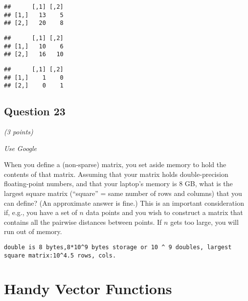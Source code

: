 \documentclass[
]{article}
\newenvironment{Shaded}{\begin{snugshade}}{\end{snugshade}}
\newcommand{\KeywordTok}[1]{\textcolor[rgb]{0.13,0.29,0.53}{\textbf{#1}}}
\newcommand{\NormalTok}[1]{#1}
\newcommand{\OperatorTok}[1]{\textcolor[rgb]{0.81,0.36,0.00}{\textbf{#1}}}
\newcommand{\StringTok}[1]{\textcolor[rgb]{0.31,0.60,0.02}{#1}}
\begin{document}
\begin{verbatim}
##      [,1] [,2]
## [1,]   13    5
## [2,]   20    8
\end{verbatim}

\begin{Shaded}
\end{Shaded}

\begin{verbatim}
##      [,1] [,2]
## [1,]   10    6
## [2,]   16   10
\end{verbatim}

\begin{Shaded}
\end{Shaded}

\begin{verbatim}
##      [,1] [,2]
## [1,]    1    0
## [2,]    0    1
\end{verbatim}

\hypertarget{question-23}{%
\subsection{Question 23}\label{question-23}}

\emph{(3 points)}

\emph{Use Google}

When you define a (non-sparse) matrix, you set aside memory to hold the
contents of that matrix. Assuming that your matrix holds
double-precision floating-point numbers, and that your laptop's memory
is 8 GB, what is the largest square matrix (``square'' = same number of
rows and columns) that you can define? (An approximate answer is fine.)
This is an important consideration if, e.g., you have a set of \(n\)
data points and you wish to construct a matrix that contains all the
pairwise distances between points. If \(n\) gets too large, you will run
out of memory.

\begin{verbatim}
double is 8 bytes,8*10^9 bytes storage or 10 ^ 9 doubles, largest square matrix:10^4.5 rows, cols.
\end{verbatim}

\hypertarget{handy-vector-functions}{%
\section{Handy Vector Functions}\label{handy-vector-functions}}
\end{document}
